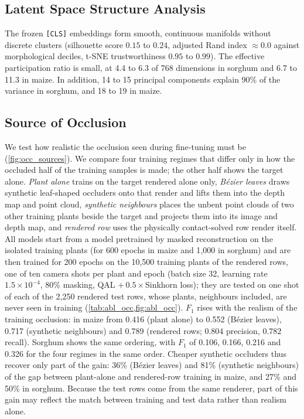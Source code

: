 \documentclass[10pt,twocolumn,letterpaper]{article}
\begin{document}
\subsection{Latent Space Structure Analysis}
The frozen \texttt{[CLS]} embeddings form smooth, continuous manifolds without discrete clusters (silhouette score $0.15$ to $0.24$, adjusted Rand index $\approx 0.0$ against morphological deciles, t-SNE trustworthiness $0.95$ to $0.99$). The effective participation ratio is small, at 4.4 to 6.3 of 768 dimensions in sorghum and 6.7 to 11.3 in maize. In addition, 14 to 15 principal components explain 90\% of the variance in sorghum, and 18 to 19 in maize.
\subsection{Source of Occlusion}
\label{sec:abl_occ}

We test how realistic the occlusion seen during fine-tuning must be (\cref{fig:occ_sources}). We compare four
training regimes that differ only in how the occluded half of the training samples is made; the other half shows the
target alone. \emph{Plant alone} trains on the target rendered alone only, \emph{B\'ezier leaves} draws
synthetic leaf-shaped occluders onto that render and lifts them into the depth map and point cloud, \emph{synthetic
neighbours} places the unbent point clouds of two other training plants beside the target and projects them
into its image and depth map, and \emph{rendered row} uses the physically contact-solved row render itself. All models start
from a model pretrained by masked reconstruction on the isolated training plants (for 600 epochs in maize and 1{,}000 in
sorghum) and are then trained for 200 epochs on the 10{,}500 training plants of the rendered rows, one of ten camera shots
per plant and epoch (batch size 32, learning rate $1.5\times10^{-4}$, 80\% masking, QAL $+\,0.5\times$Sinkhorn loss); they
are tested on one shot of each of the 2{,}250 rendered test rows, whose plants, neighbours included, are never seen in
training (\cref{tab:abl_occ,fig:abl_occ}). $F_1$ rises with the
realism of the training occlusion: in maize from 0.416 (plant alone) to 0.552 (B\'ezier leaves), 0.717 (synthetic
neighbours) and 0.789 (rendered rows; $0.804$ precision, $0.782$ recall). Sorghum shows the same ordering, with $F_1$ of 0.106, 0.166, 0.216 and 0.326 for the four regimes in the same order. Cheaper synthetic occluders
thus recover only part of the gain: 36\% (B\'ezier leaves) and 81\% (synthetic neighbours) of the gap between plant-alone
and rendered-row training in maize, and 27\% and 50\% in sorghum. Because the test rows come from the same renderer, part of this gain may
reflect the match between training and test data rather than realism alone.
\end{document}
